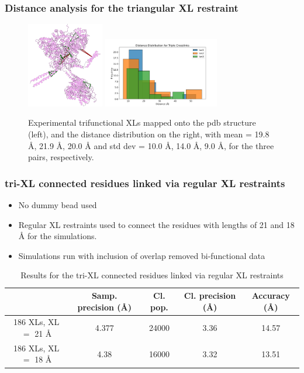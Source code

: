 \documentclass[a4paper,8pt]{beamer}
\begin{document}
%
\begin{frame}
  \frametitle{Distance analysis for the triangular XL restraint}
  \begin{figure}
    \centering
    \includegraphics[width=0.3\textwidth]{test-figures/exp-triples.png}
    \includegraphics[width=0.45\textwidth]{test-figures/tri-distribution.png}
    \caption{Experimental trifunctional XLs mapped onto the pdb structure (left), and the distance distribution on the right, with
    mean = 19.8 {\AA}, 21.9 {\AA}, 20.0 {\AA} and std dev = 10.0 {\AA}, 14.0 {\AA}, 9.0 {\AA}, for the three pairs, respectively.}
    \end{figure}
\end{frame}
%
\begin{frame}
\frametitle{tri-XL connected residues linked via regular XL restraints}
\begin{itemize}
  \item No dummy bead used
  \item Regular XL restraints used to connect the residues with lengths of 21 and 18 {\AA} for the simulations.
  \item Simulations run with inclusion of overlap removed bi-functional data
\end{itemize}
\begin{table}
  \centering
  \caption{Results for the tri-XL connected residues linked via regular XL restraints}
  \begin{tabular}{|c|c|c|c|c|}
      \hline
                                   & Samp. precision ({\AA}) & Cl. pop. & Cl. precision ({\AA}) & Accuracy ({\AA})\\ \hline
      186 XLs, XL $=$ 21 {\AA} & 4.377  & 24000 & 3.36 & 14.57\\ \hline
      186 XLs, XL $=$ 18 {\AA} & 4.38   & 16000 & 3.32 & 13.51\\ \hline
  \end{tabular}
\end{table}
\end{frame}
\end{document}
